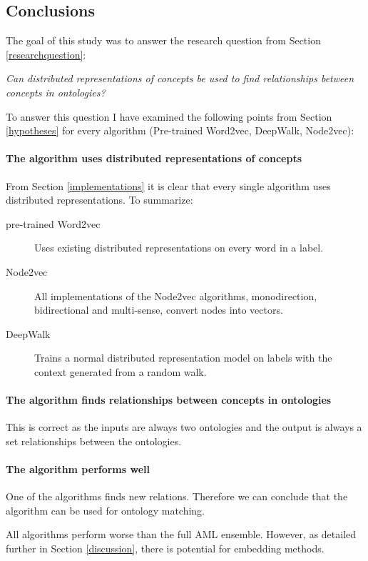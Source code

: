 \documentclass{article}
\begin{document}
 \subsection{Conclusions} \label{conclusions}
 The goal of this study was to answer the research question from Section \ref{researchquestion}:

 \begin{center}
 \textit{
 Can distributed representations of concepts be used to find relationships between concepts in ontologies?
 }
 \end{center}
 
 To answer this question I have examined the following points from Section \ref{hypotheses} for every algorithm (Pre-trained Word2vec, DeepWalk, Node2vec):
 
\paragraph{The algorithm uses distributed representations of concepts}
 From Section \ref{implementations} it is clear that every single algorithm uses distributed representations. To summarize:
\begin{description}
\item[pre-trained Word2vec] Uses existing distributed representations on every word in a label.
\item[Node2vec] All implementations of the Node2vec algorithms, monodirection, bidirectional and multi-sense, convert nodes into vectors.
\item[DeepWalk] Trains a normal distributed representation model on labels with the context generated from a random walk.
\end{description}
\paragraph{The algorithm finds relationships between concepts in ontologies}
This is correct as the inputs are always two ontologies and the output is always a set relationships between the ontologies.
\paragraph{The algorithm performs well}
 One of the algorithms finds new relations. Therefore we can conclude that the algorithm can be used for ontology matching.

 All algorithms perform worse than the full AML ensemble. However, as detailed further in Section \ref{discussion}, there is potential for embedding methods.
\end{document}
